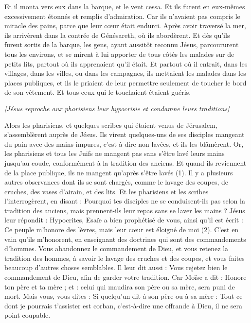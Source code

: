 \begin{multicols}{2}
Et il monta vers eux dans la barque, et le vent cessa. Et ils furent en eux-mêmes excessivement étonnés et remplis d’admiration.
Car ils n'avaient pas compris le miracle des pains, parce que leur cœur était endurci.
Après avoir traversé la mer, ils arrivèrent dans la contrée de Génésareth, où ils abordèrent.
Et dès qu’ils furent sortis de la barque, les gens, ayant aussitôt reconnu Jésus,
parcoururent tous les environs, et se mirent à lui apporter de tous côtés les malades sur de petits lits, partout où ils apprenaient qu'il était.
Et partout où il entrait, dans les villages, dans les villes, ou dans les campagnes, ils mettaient les malades dans les places publiques, et ils le priaient de leur permettre seulement de toucher le bord de son vêtement. Et tous ceux qui le touchaient étaient guéris.
\begin{center}
\textit{[Jésus reproche aux pharisiens leur hypocrisie et condamne leurs traditions]}
\end{center}
\VerseOne{}Alors les pharisiens, et quelques scribes qui étaient venus de Jérusalem, s'assemblèrent auprès de Jésus.
Ils virent quelques-uns de ses disciples mangeant du pain avec des mains impures, c'est-à-dire non lavées, et ils les blâmèrent.
Or, les pharisiens et tous les Juifs ne mangent pas sans s’être lavé leurs mains jusqu’au coude, conformément à la tradition des anciens.
Et quand ils reviennent de la place publique, ils ne mangent qu’après s’être lavés (1). Il y a plusieurs autres observances dont ils se sont chargés, comme le lavage des coupes, de cruches, des vases d'airain, et des lits.
Et les pharisiens et les scribes l'interrogèrent, en disant : Pourquoi tes disciples ne se conduisent-ils pas selon la tradition des anciens, mais prennent-ils leur repas sans se laver les mains ?
Jésus leur répondit : Hypocrites, Esaïe a bien prophétisé de vous, ainsi qu’il est écrit : Ce peuple m'honore des lèvres, mais leur cœur est éloigné de moi (2).
C’est en vain qu’ils m'honorent, en enseignant des doctrines qui sont des commandements d'hommes.
Vous abandonnez le commandement de Dieu, et vous retenez la tradition des hommes, à savoir le lavage des cruches et des coupes, et vous faites beaucoup d'autres choses semblables.
Il leur dit aussi : Vous rejetez bien le commandement de Dieu, afin de garder votre tradition.
Car Moïse a dit : Honore ton père et ta mère ; et : celui qui maudira son père ou sa mère, sera puni de mort.
Mais vous, vous dites : Si quelqu'un dit à son père ou à sa mère : Tout ce dont je pourrais t’assister est corban, c’est-à-dire une offrande à Dieu, il ne sera point coupable.

\end{multicols}
